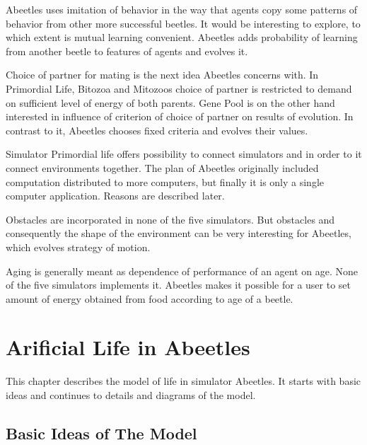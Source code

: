 \documentclass[a4paper,12pt]{report}
\begin{document}
Abeetles uses imitation of behavior in the way that agents copy some patterns of behavior from other more successful beetles. It would be interesting to explore, to which extent is mutual learning convenient. Abeetles adds probability of learning from another beetle to features of agents and evolves it.

Choice of partner for mating is the next idea Abeetles concerns with. In Primordial Life, Bitozoa and Mitozoos choice of partner is restricted to demand on sufficient level of energy of both parents. Gene Pool is on the other hand interested in influence of criterion of choice of partner on results of evolution. \cite{GenePool2} In contrast to it, Abeetles chooses fixed criteria and evolves their values.   

Simulator Primordial life offers possibility to connect simulators and in order to it connect environments together. The plan of Abeetles originally included computation distributed to more computers, but finally it is only a single computer application. Reasons are described later. 

Obstacles are incorporated in none of the five simulators. But obstacles and consequently the shape of the environment can be very interesting for Abeetles, which evolves strategy of motion.  

Aging is generally meant as dependence of performance of an agent on age. None of the five simulators implements it. Abeetles makes it possible for a user to set amount of energy obtained from food according to age of a beetle.


\chapter {Arificial Life in Abeetles}

This chapter describes the model of life in simulator Abeetles. It starts with basic ideas and continues to details and diagrams of the model.  

\section {Basic Ideas of The Model}
\end{document}
